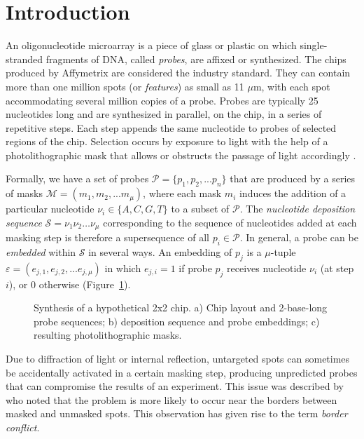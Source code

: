 \documentclass{bioinfo}
\begin{document}
\section{Introduction}

An oligonucleotide microarray is a piece of glass or plastic on which single-stranded fragments of DNA, called \emph{probes}, are affixed or synthesized. The chips produced by Affymetrix are considered the industry standard. They can contain more than one million spots (or \emph{features}) as small as 11 $\mu$m, with each spot accommodating several million copies of a probe. Probes are typically 25 nucleotides long and are synthesized in parallel, on the chip, in a series of repetitive steps. Each step appends the same nucleotide to probes of selected regions of the chip. Selection occurs by exposure to light with the help of a photolithographic mask that allows or obstructs the passage of light accordingly \citep{FODOR91}.

Formally, we have a set of probes $\mathcal{P} = \{p_{1}, p_{2}, ... p_{n}\}$ that are produced by a series of masks $\mathcal{M} = (m_{1}, m_{2}, ... m_{\mu})$, where each mask $m_{i}$ induces the addition of a particular nucleotide $\nu_{i} \in \{A, C, G, T\}$ to a subset of $\mathcal{P}$. The \emph{nucleotide deposition sequence} $\mathcal{S} = \nu_{1} \nu_{2} \ldots \nu_{\mu}$ corresponding to the sequence of nucleotides added at each masking step is therefore a supersequence of all $p_{i} \in \mathcal{P}$. In general, a probe can be \emph{embedded} within $\mathcal{S}$ in several ways. An embedding of $p_{j}$ is a $\mu$-tuple $\varepsilon = (e_{j,1}, e_{j,2}, ... e_{j,\mu})$ in which $e_{j,i} = 1$ if probe $p_{j}$ receives nucleotide $\nu_{i}$ (at step $i$), or 0 otherwise (Figure~\ref{fig:01}).

\begin{figure}
\caption{Synthesis of a hypothetical 2x2 chip. a) Chip layout and 2-base-long probe sequences; b) deposition sequence and probe embeddings; c) resulting photolithographic masks.}\label{fig:01}
\end{figure}

Due to diffraction of light or internal reflection, untargeted spots can sometimes be accidentally activated in a certain masking step, producing unpredicted probes that can compromise the results of an experiment. This issue was described by \citealp{FODOR91} who noted that the problem is more likely to occur near the borders between masked and unmasked spots. This observation has given rise to the term \emph{border conflict}.
\end{document}
